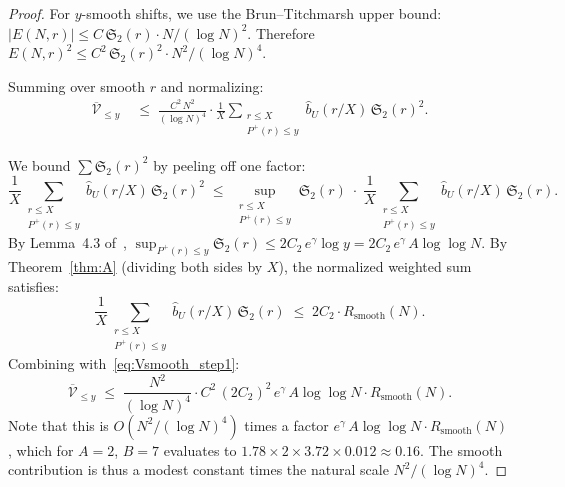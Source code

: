 \documentclass[11pt,reqno]{amsart}
\theoremstyle{plain}
\theoremstyle{definition}
\theoremstyle{remark}
\newcommand{\Rsmooth}{R_{\mathrm{smooth}}}
\newcommand{\Sfrak}{\mathfrak{S}_2}
\newcommand{\Pplus}{P^{+}}
\begin{document}
\begin{proof}
For $y$-smooth shifts, we use the Brun--Titchmarsh upper bound:
$|E(N,r)| \le C\, \Sfrak(r) \cdot N/(\log N)^2$. Therefore
$E(N,r)^2 \le C^2\, \Sfrak(r)^2 \cdot N^2/(\log N)^4$.

Summing over smooth $r$ and normalizing:
\begin{align}
  \overline{\mathcal{V}}_{\le y} &\;\le\;
  \frac{C^2\, N^2}{(\log N)^4} \cdot
  \frac{1}{X}\sum_{\substack{r \le X \\ \Pplus(r) \le y}}
  \hat{b}_U(r/X)\, \Sfrak(r)^2. \label{eq:Vsmooth_step1}
\end{align}

We bound $\sum \Sfrak(r)^2$ by peeling off one factor:
\[
  \frac{1}{X}\sum_{\substack{r \le X \\ \Pplus(r) \le y}}
  \hat{b}_U(r/X)\, \Sfrak(r)^2
  \;\le\;
  \sup_{\substack{r \le X \\ \Pplus(r) \le y}} \Sfrak(r)
  \;\cdot\;
  \frac{1}{X}\sum_{\substack{r \le X \\ \Pplus(r) \le y}}
  \hat{b}_U(r/X)\, \Sfrak(r).
\]
By Lemma~4.3 of~\cite{MT1},
$\sup_{\Pplus(r)\le y} \Sfrak(r) \le 2C_2\, e^{\gamma}\log y
= 2C_2\, e^{\gamma}\, A\log\log N$.
By Theorem~\ref{thm:A} (dividing both sides by $X$),
the normalized weighted sum satisfies:
\[
  \frac{1}{X}\sum_{\substack{r \le X \\ \Pplus(r) \le y}}
  \hat{b}_U(r/X)\, \Sfrak(r)
  \;\le\; 2C_2 \cdot \Rsmooth(N).
\]
Combining with~\eqref{eq:Vsmooth_step1}:
\[
  \overline{\mathcal{V}}_{\le y} \;\le\;
  \frac{N^2}{(\log N)^4} \cdot C^2\, (2C_2)^2\,
  e^{\gamma}\, A\log\log N \cdot \Rsmooth(N).
\]
Note that this is $O(N^2/(\log N)^4)$ times a factor
$e^{\gamma}\, A\log\log N \cdot \Rsmooth(N)$, which for
$A = 2$, $B = 7$ evaluates to
$1.78 \times 2 \times 3.72 \times 0.012 \approx 0.16$.
The smooth contribution is thus a modest constant times the
natural scale $N^2/(\log N)^4$.
\end{proof}
\end{document}
